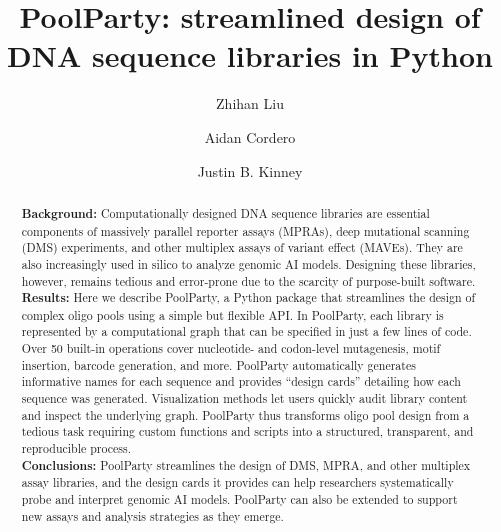 \documentclass[twoside]{kinneylab_preprintstyle}
\newcommand{\quoted}[1]{#1}
\begin{document}
\title{PoolParty: streamlined design of DNA sequence libraries in Python}

\author[1]{Zhihan Liu}
\author[1]{Aidan Cordero}
\author[1,\Letter]{Justin B. Kinney}


\begin{abstract}
\textbf{Background:} Computationally designed DNA sequence libraries are
essential components of massively parallel reporter assays (MPRAs), deep
mutational scanning (DMS) experiments, and other multiplex assays of variant
effect (MAVEs). They are also increasingly used in silico to analyze genomic AI
models. \quoted{Designing these libraries, however, remains tedious and
error-prone due to the scarcity of purpose-built software.}\\

\textbf{Results:} Here we describe PoolParty, a Python package that streamlines
the design of complex oligo pools using a simple but flexible API. In PoolParty,
each library is represented by a computational graph that can be specified in
just a few lines of code. Over 50 built-in operations cover nucleotide- and
codon-level mutagenesis, motif insertion, barcode generation, and more.
PoolParty automatically generates informative names for each sequence and
provides ``design cards'' detailing how each sequence was generated.
Visualization methods let users quickly audit library content and inspect the
underlying graph. PoolParty thus transforms oligo pool design from a tedious
task requiring custom functions and scripts into a structured, transparent, and
reproducible process.\\

\textbf{Conclusions:} PoolParty streamlines the design of DMS, MPRA, and other
multiplex assay libraries, and the design cards it provides can help researchers
systematically probe and interpret genomic AI models. PoolParty can also be
extended to support new assays and analysis strategies as they emerge.
\end{abstract}

\maketitle





\end{document}
